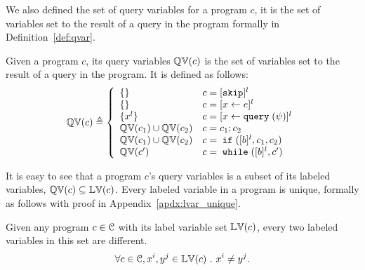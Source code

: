 %
We also defined the set of query variables for a program $c$,
it is the set of variables set to the result of a query in the program formally in Definition~\ref{def:qvar}.
\begin{defn} 
  \label{def:qvar}
Given a program $c$, its query variables 
$\mathbb{QV}(c)$ is the set of variables set to the result of a query in the program.
It is defined as follows:
{\footnotesize
$$
  \qvar(c) \triangleq
  \left\{
    \begin{array}{ll}
      \{\}           
        & {c} = [{\eskip}]^{l} 
        \\
      \{\}                  
      & {c} = [{\assign x \expr}]^{l} 
      \\
      \{{x}^l\}                  
      & {c} = [{\assign x \query(\qexpr)}]^{l} 
      \\
      \qvar(c_1) \cup \qvar(c_2)  
      & {c} = {c_1};{c_2}
      \\
      \qvar(c_1) \cup \qvar(c_2) 
      & {c} =\eif([\bexpr]^{l}, c_1, c_2) 
      \\
      \qvar(c')
      & {c}   = \ewhile ([\bexpr]^{l}, {c}')
\end{array}
\right.
$$
}
\end{defn}
%
It is easy to see that a program $c$'s query variables is a subset of 
its labeled variables, $\mathbb{QV}(c) \subseteq \mathbb{LV}(c)$.
%
%
Every labeled variable in a program is unique, formally as follows with proof in Appendix~\ref{apdx:lvar_unique}.
\begin{lem}
  \label{lem:lvar_unique}
  Given any program $c \in \mathcal{C}$ with its label variable set $\mathbb{LV}(c)$,
  every two labeled variables in this set are different.
  \[
    \forall c \in \mathcal{C}, x^i, y^j \in \mathbb{LV}(c) ~.~ x^i \neq y^j.
    \]
\end{lem}
%
%

